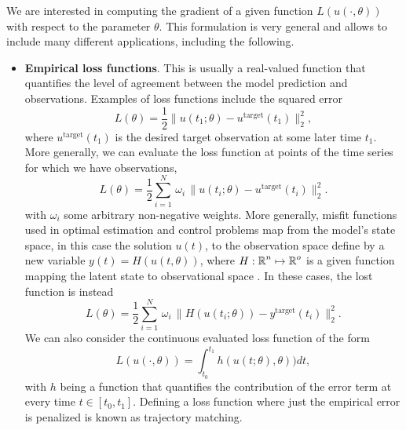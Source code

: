 We are interested in computing the gradient of a given function $L(u(\cdot, \theta))$ with respect to the parameter $\theta$.
This formulation is very general and allows to include many different applications, including the following. 
\begin{itemize}
    \item \textbf{Empirical loss functions}. This is usually a real-valued function that quantifies the level of agreement between the model prediction and observations. Examples of loss functions include the squared error
    \begin{equation}
         L(\theta) = \frac{1}{2} \| u(t_1; \theta) - u^{\text{target}}(t_1) \|_2^2,
         \label{eq:quadratic-loss-function}
    \end{equation}
    where $u^{\text{target}}(t_1)$ is the desired target observation at some later time $t_1$.
    More generally, we can evaluate the loss function at points of the time series for which we have observations, 
    \begin{equation}
        L(\theta) 
        = 
        \frac{1}{2} \sum_{i=1}^N 
        \, \omega_i \,
        \| u(t_i; \theta) - u^{\text{target}}(t_i) \|_2^2.
    \end{equation}
    with $\omega_i$ some arbitrary non-negative weights.
    More generally, misfit functions used in optimal estimation and control problems map from the model's state space, in this case the solution $u(t)$, to the observation space define by a new variable $y(t) = H(u(t, \theta))$, where $H: \operatorname{\mathbb{R}}^n \mapsto \operatorname{\mathbb{R}}^o$ is a given function mapping the latent state to observational space \cite{1975-Bryson-Ho-optimal-control}. 
    In these cases, the lost function is instead 
    \begin{equation}
        L(\theta) 
        =
        \frac{1}{2} 
        \sum_{i=1}^N
        \, \omega_i \,
        \| H(u(t_i; \theta)) - y^{\text{target}}(t_i) \|_2^2.
        \label{eq:loss-state-observation}
    \end{equation}
    We can also consider the continuous evaluated loss function of the form
    \begin{equation}
         L(u(\cdot, \theta)) = \int_{t_0}^{t_1} h( u(t;\theta), \theta) ) dt, 
         \label{eq:integrated-loss-function}
    \end{equation}
    with $h$ being a function that quantifies the contribution of the error term at every time $t \in [t_0, t_1]$. 
    Defining a loss function where just the empirical error is penalized is known as trajectory matching. 

\end{itemize}
